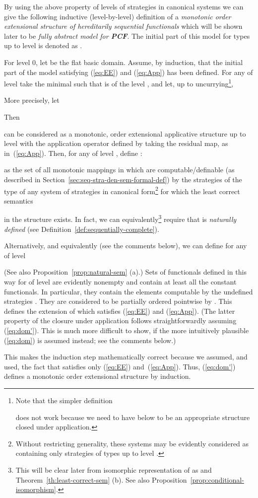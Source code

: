 \documentclass[fleqn]{LMCS}
\theoremstyle{plain}\newtheorem{satz}[thm]{Satz}
\theoremstyle{plain}\newtheorem{hyp}[thm]{Hypothesis}
\theoremstyle{plain}\newtheorem{hyps}[thm]{Hypotheses}
\theoremstyle{definition}\newtheorem{note}[thm]{Note}
\newcommand{\PCF}{\mbox{\bf PCF}}
\newcommand{\?}{\mbox{?}}
\begin{document}
\noindent
By using the above property of levels of strategies in canonical systems
we can give the
following inductive (level-by-level) definition of a 
\emph{monotonic order extensional structure
 of hereditarily sequential functionals} 
which will be shown later to be \emph{fully abstract model for\/ \PCF}. 
The initial part of this model for types up to level  is denoted as .
\begin{defi}\label{def:bbQ}For level 0, 
let  
be the flat basic domain. 
Assume, by induction, that 
the initial part of the model 
 satisfying (\ref{eq:EE}) and (\ref{eq:App}) 
has been defined. 
For any  of level 
take the minimal  such that 
 is of the level , and let, 
up to uncurrying\footnote{Note that the simpler definition 

does not work 
because we need to have below  to be an appropriate 
structure closed under application. 
}, 

\noindent
More precisely, let 

Then

can be considered as  
a monotonic, order extensional applicative structure up to level  
with the application operator defined by taking the residual map, 
as in~(\ref{eq:App}). 
Then, for any  of level , define : 

as the set of all monotonic 
mappings in  which are computable/definable 
(as described in Section~\ref{sec:seq-stra-den-sem-formal-def}) 
by the strategies  of the type
 of any system of strategies in canonical form\footnote{Without restricting generality, these systems 
may be evidently considered as 
containing only strategies of types  up to level .
}
for which 
the least correct semantics 
 
in the structure  exists. 
In fact, we can equivalently\footnote{This will be clear later from isomorphic representation of 
 as  and Theorem~\ref{th:least-correct-sem} (b). See also 
Proposition~\ref{prop:conditional-isomorphism}. 
}
require that  is \emph{naturally defined} 
(see Definition~\ref{def:sequentially-complete}). 

Alternatively, and equivalently (see the comments below), we can define 
for any  of level~\mbox{}

(See also Proposition~\ref{prop:natural-sem} (a).)
Sets of functionals  defined in this way 
for  of level  are evidently nonempty and contain at least 
all the constant functionals. In particular, they contain 
the elements  computable 
by the undefined strategies . 
They are considered to be
partially ordered pointwise by . 
This defines the extension  of  
which satisfies (\ref{eq:EE}) and (\ref{eq:App}). 
(The latter property of the closure under application 
follows straightforwardly assuming (\ref{eq:dom'}).  
This is much more difficult to show, if the more intuitively plausible (\ref{eq:dom}) 
is assumed instead; see the comments below.)
 
This makes the induction step mathematically correct because we 
assumed, and used, the fact that  satisfies only 
(\ref{eq:EE}) and~(\ref{eq:App}). 
Thus, (\ref{eq:dom'}) defines a monotonic order extensional structure  by induction. 
\end{defi}
\end{document}

